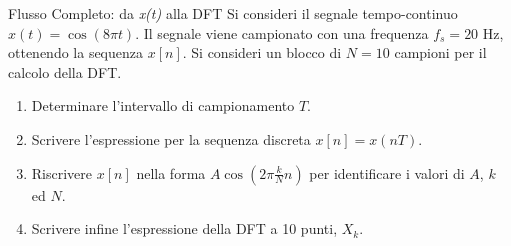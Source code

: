 
\begin{esercizio}{Flusso Completo: da \textit{x(t)} alla DFT}
    Si consideri il segnale tempo-continuo $x(t) = \cos(8\pi t)$.
    Il segnale viene campionato con una frequenza $f_s = 20$ Hz, ottenendo la sequenza $x[n]$. Si consideri un blocco di $N=10$ campioni per il calcolo della DFT.
    
    \begin{enumerate}
        \item Determinare l'intervallo di campionamento $T$.
        \item Scrivere l'espressione per la sequenza discreta $x[n] = x(nT)$.
        \item Riscrivere $x[n]$ nella forma $A \cos(2\pi \frac{k}{N}n)$ per identificare i valori di $A$, $k$ ed $N$.
        \item Scrivere infine l'espressione della DFT a 10 punti, $X_k$.
    \end{enumerate}
\end{esercizio}